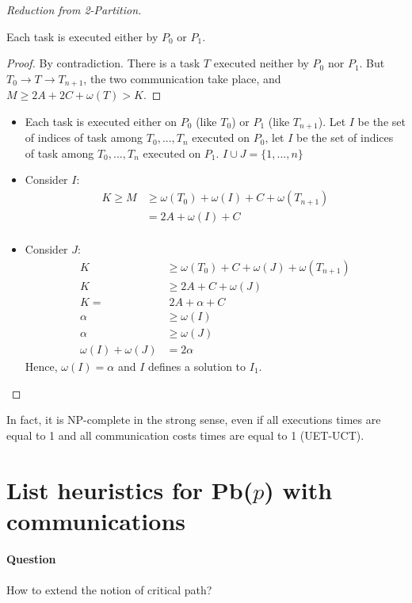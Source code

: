 \begin{proof}[Reduction from 2-Partition]
\begin{lemma}
Each task is executed either by $P_0$ or $P_1$.
\end{lemma}
\begin{proof}
By contradiction. There is a task $T$ executed neither by $P_0$ nor $P_1$. But $T_0 \to T \to T_{n+1}$, the two communication take place, and $M\geq 2A+2C+\omega(T)>K$.
\end{proof}

\begin{itemize}
\item Each task is executed either on $P_0$ (like $T_0$) or $P_1$ (like $T_{n+1}$). Let $I$ be the set of indices of task among $T_0,...,T_n$ executed on $P_0$, let $I$ be the set of indices of task among $T_0,...,T_n$ executed on $P_1$.
$I\cup J=\{1,...,n\}$
\item Consider $I$:
\begin{align*}
K\geq M & \geq \omega(T_0) + \omega(I)+C+\omega(T_{n+1})\\
& = 2A + \omega(I)+C\\
\end{align*}

\item Consider $J$:
\begin{align*}
K & \geq \omega(T_0) + C + \omega(J) + \omega(T_{n+1})\\
K & \geq 2A + C + \omega (J)\\
K= &\; 2A+\alpha+C\\
\alpha & \geq \omega(I)\\
\alpha & \geq \omega(J)\\
\omega(I)+\omega(J)&=2\alpha
\end{align*}
Hence, $\omega(I)=\alpha$ and $I$ defines a solution to $I_1$.
\end{itemize}
\end{proof}

In fact, it is NP-complete in the strong sense, even if all executions times are equal to 1 and all communication costs times are equal to 1 (UET-UCT).

\section{List heuristics for Pb($p$) with communications}
\paragraph{Question}
How to extend the notion of critical path?
